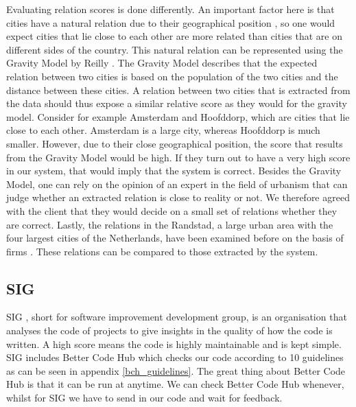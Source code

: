
Evaluating relation scores is done differently. An important factor here is that cities have a natural relation due to their geographical position \cite{tobler1970computer}, so one would expect cities that lie close to each other are more related than cities that are on different sides of the country. This natural relation can be represented using the Gravity Model by Reilly \cite{reilly1931law}. The Gravity Model describes that the expected relation between two cities is based on the population of the two cities and the distance between these cities. A relation between two cities that is extracted from the data should thus expose a similar relative score as they would for the gravity model. Consider for example Amsterdam and Hoofddorp, which are cities that lie close to each other. Amsterdam is a large city, whereas Hoofddorp is much smaller. However, due to their close geographical position, the score that results from the Gravity Model would be high. If they turn out to have a very high score in our system, that would imply that the system is correct. Besides the Gravity Model, one can rely on the opinion of an expert in the field of urbanism that can judge whether an extracted relation is close to reality or not. We therefore agreed with the client that they would decide on a small set of relations whether they are correct. Lastly, the relations in the Randstad, a large urban area with the four largest cities of the Netherlands, have been examined before on the basis of firms \cite{van2010economic}. These relations can be compared to those extracted by the system.

\subsection{SIG}
SIG \cite{sig}, short for software improvement development group, is an organisation that analyses the code of projects to give insights in the quality of how the code is written. A high score means the code is highly maintainable and is kept simple. SIG includes Better Code Hub \cite{better_code_hub} which checks our code according to 10 guidelines as can be seen in appendix \ref{bch_guidelines}. The great thing about Better Code Hub is that it can be run at anytime. We can check Better Code Hub whenever, whilst for SIG we have to send in our code and wait for feedback.